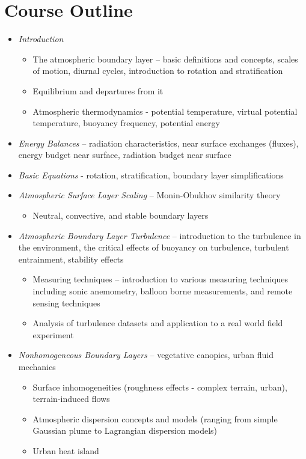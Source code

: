 \documentclass[11pt]{article}
\theoremstyle{mytheor}
\begin{document}
\section*{Course Outline}
\begin{itemize}
\item \textit{Introduction}
\begin{itemize}
	\item The atmospheric boundary layer – basic definitions and concepts, scales of motion, diurnal cycles, introduction to rotation and stratification
	\item Equilibrium and departures from it
	\item Atmospheric thermodynamics - potential temperature, virtual potential temperature, buoyancy frequency, potential energy
\end{itemize}
\item \textit{Energy Balances} – radiation characteristics, near surface exchanges (fluxes), energy budget near surface, radiation budget near surface
\item \textit{Basic Equations} - rotation, stratification, boundary layer simplifications
\item \textit{Atmospheric Surface Layer Scaling} – Monin-Obukhov similarity theory
\begin{itemize}
	\item Neutral, convective, and stable boundary layers
\end{itemize}
\item \textit{Atmospheric Boundary Layer Turbulence} – introduction to the turbulence in the environment, the critical effects of buoyancy on turbulence, turbulent entrainment, stability effects
\begin{itemize}
	\item Measuring techniques – introduction to various measuring techniques including sonic anemometry, balloon borne measurements, and remote sensing techniques
	\item Analysis of turbulence datasets and application to a real world field experiment
\end{itemize}
\item \textit{Nonhomogeneous Boundary Layers} – vegetative canopies, urban fluid mechanics
\begin{itemize}
	\item Surface inhomogeneities (roughness effects - complex terrain, urban), terrain-induced flows
	\item Atmospheric dispersion concepts and models (ranging from simple Gaussian plume to Lagrangian dispersion models)
	\item Urban heat island
\end{itemize}
\end{itemize}
\end{document}
